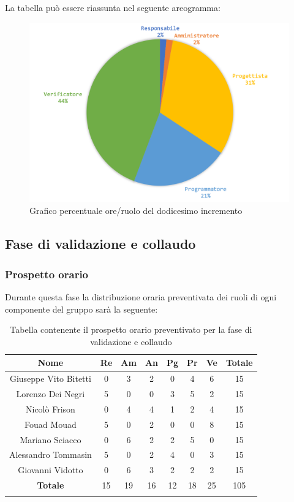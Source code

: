 		La tabella può essere riassunta nel seguente areogramma:
		\begin{figure}[H]
			\centering
			\includegraphics[width=0.8\linewidth]{./images/preventivo/incremento12-2.png}
			\caption{Grafico percentuale ore/ruolo del dodicesimo incremento}
			\label{fig:grafico costi ruolo incremento XII}
		\end{figure}
	
	
	
	\subsection{Fase di validazione e collaudo}
		\subsubsection{Prospetto orario}
		Durante questa fase la distribuzione oraria preventivata dei ruoli di ogni componente del gruppo sarà la seguente:
		
		\begin{longtable}{|c|c|c|c|c|c|c|c|}
			\hline
			\rowcolor{lighter-grayer}
			\textbf{Nome} & \textbf{Re} & \textbf{Am} & \textbf{An} & \textbf{Pg}  & \textbf{Pr}   & \textbf{Ve} & \textbf{Totale} \\
			\hline
			\endfirsthead
			
			\hline
			Giuseppe Vito Bitetti 		 & 0 & 3 & 2 & 0 & 4 & 6 & 15\\
			\hline
			\hline
			Lorenzo Dei Negri			 & 5 & 0 & 0 & 3 & 5 & 2 & 15\\
			\hline
			\hline
			Nicolò Frison				      & 0 & 4 & 4 & 1 & 2 & 4 & 15\\
			\hline
			\hline
			Fouad Mouad 				   & 5 & 0 & 2 & 0 & 0 & 8 & 15\\
			\hline
			\hline
			Mariano Sciacco 			 & 0 & 6 & 2 & 2 & 5 & 0 & 15\\
			\hline
			\hline
			Alessandro Tommasin    & 5 & 0 & 2 & 4 & 0 & 3 & 15\\
			\hline
			\hline
			Giovanni Vidotto 			  & 0 & 6 & 3 & 2 & 2 & 2 & 15\\
			\hline 
			\textbf{Totale}			 	& 15 & 19 & 16 & 12 & 18 & 25 & 105\\
			\hline
			\caption{Tabella contenente il prospetto orario preventivato per la fase di validazione e collaudo}
		\end{longtable}
		\pagebreak
		
